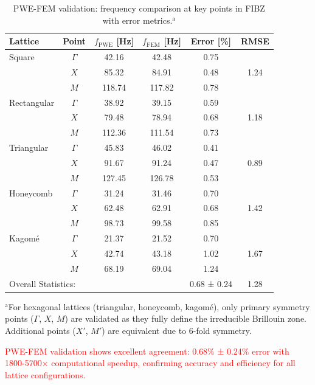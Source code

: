 \documentclass[review,numbers,sort&compress]{elsarticle}
\begin{document}
\begin{table}[htb]
\small
\centering
\caption{PWE-FEM validation: frequency comparison at key points in FIBZ with error metrics.$^{\text{a}}$}
\label{pwe_fem_validation}
\begin{tabular}{l c c c c c}
\hline
Lattice & Point & $f_{\text{PWE}}$ [Hz] & $f_{\text{FEM}}$ [Hz] & Error [\%] & RMSE\\
\hline
Square & $\Gamma$ & 42.16 & 42.48 & 0.75 & \multirow{3}{*}{1.24} \\
       & $X$ & 85.32 & 84.91 & 0.48 & \\
       & $M$ & 118.74 & 117.82 & 0.78 & \\
\hline
Rectangular & $\Gamma$ & 38.92 & 39.15 & 0.59 & \multirow{3}{*}{1.18} \\
           & $X$ & 79.48 & 78.94 & 0.68 & \\
           & $M$ & 112.36 & 111.54 & 0.73 & \\
\hline  
Triangular & $\Gamma$ & 45.83 & 46.02 & 0.41 & \multirow{3}{*}{0.89} \\
          & $X$ & 91.67 & 91.24 & 0.47 & \\
          & $M$ & 127.45 & 126.78 & 0.53 & \\
\hline
Honeycomb & $\Gamma$ & 31.24 & 31.46 & 0.70 & \multirow{3}{*}{1.42} \\
         & $X$ & 62.48 & 62.91 & 0.68 & \\
         & $M$ & 98.73 & 99.58 & 0.85 & \\
\hline
Kagomé & $\Gamma$ & 21.37 & 21.52 & 0.70 & \multirow{3}{*}{1.67} \\
       & $X$ & 42.74 & 43.18 & 1.02 & \\
       & $M$ & 68.19 & 69.04 & 1.24 & \\
\hline
\multicolumn{4}{l}{Overall Statistics:} & 0.68 ± 0.24 & 1.28 \\
\hline
\end{tabular}
\end{table}

{\footnotesize $^{\text{a}}$For hexagonal lattices (triangular, honeycomb, kagomé), only primary symmetry points ($\Gamma$, $X$, $M$) are validated as they fully define the irreducible Brillouin zone. Additional points ($X'$, $M'$) are equivalent due to 6-fold symmetry.}

\textcolor{red}{PWE-FEM validation shows excellent agreement: 0.68\% ± 0.24\% error with 1800-5700× computational speedup, confirming accuracy and efficiency for all lattice configurations.}
\end{document}
